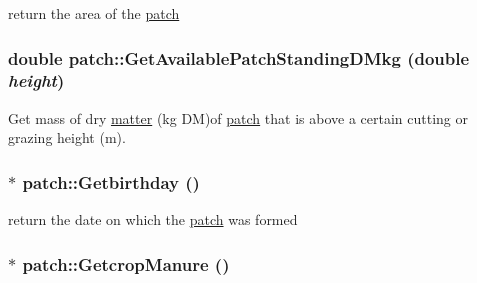 return the area of the \hyperlink{classpatch}{patch} \hypertarget{classpatch_ade5035e5e8a4319606944c22a1e360da}{
\subsubsection[{GetAvailablePatchStandingDMkg}]{\setlength{\rightskip}{0pt plus 5cm}double patch::GetAvailablePatchStandingDMkg (double {\em height})}}
\label{classpatch_ade5035e5e8a4319606944c22a1e360da}


Get mass of dry \hyperlink{classmatter}{matter} (kg DM)of \hyperlink{classpatch}{patch} that is above a certain cutting or grazing height (m). \hypertarget{classpatch_a7093fdf2689a46a666762bb73803aadf}{
\subsubsection[{Getbirthday}]{$\ast$ patch::Getbirthday ()}}
\label{classpatch_a7093fdf2689a46a666762bb73803aadf}


return the date on which the \hyperlink{classpatch}{patch} was formed \hypertarget{classpatch_a7efc99bd3ae91359690c12eee53a7e4b}{
\subsubsection[{GetcropManure}]{$\ast$ patch::GetcropManure ()}}
\label{classpatch_a7efc99bd3ae91359690c12eee53a7e4b}


